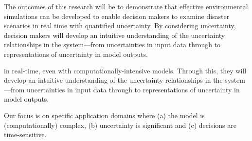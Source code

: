 \iffalse
We will address this grand challenge through a \emph{live coding} (or
`live programming') approach to the development and deployment of
software systems for environmental simulation in the presence of
uncertainty. We will \textbf{develop} new `inundation models' (models
of riverine floods, storm surges and tsunamis) which use sparse grids
and uncertainty quantification to dramatically increase the speed and
usefulness of model predictions and their associated uncertainty. We
will \textbf{deploy} `live' distributed computing infrastructure to
\emph{rapidly prototype} the human interface to these new
environmental simulations and to transform the traditional,
batch-oriented workflow of environmental simulation into a highly
interactive one.
We will \textbf{evaluate team coordination and
decision-making} in the presence of uncertainty through role-playing
scenarios of representative flood and tsunami situations. 
\fi


The outcomes of this research will be to demonstrate that effective environmental simulations can be developed to enable
decision makers to examine disaster scenarios in real time with quantified uncertainty. By considering uncertainty, decision makers will
develop an intuitive understanding of the uncertainty relationships in the
system—from uncertainties in input data through to representations of
uncertainty in model outputs. 







\iffalse

in real-time, even
with computationally-intensive models. Through this, they will develop
an intuitive understanding of the uncertainty relationships in the
system—from uncertainties in input data through to representations of
uncertainty in model outputs. 



Our focus is on specific application
domains where (a) the model is (computationally) complex, (b)
uncertainty is significant and (c) decisions are time-sensitive.



